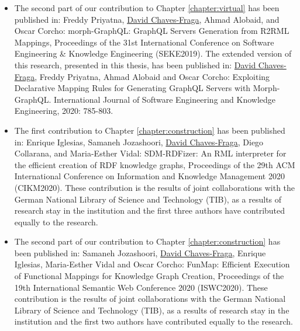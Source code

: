 \begin{itemize}
    \item The second part of our contribution to Chapter \ref{chapter:virtual} has been published in:  Freddy Priyatna, \underline{David Chaves-Fraga}, Ahmad Alobaid, and Oscar Corcho: morph-GraphQL: GraphQL Servers Generation from R2RML Mappings, Proceedings of the 31st International Conference on Software Engineering \& Knowledge Engineering (SEKE2019). The extended version of this research, presented in this thesis, has been published in: \underline{David Chaves-Fraga}, Freddy Priyatna, Ahmad Alobaid and Oscar Corcho: Exploiting Declarative Mapping Rules for Generating GraphQL Servers with Morph-GraphQL. International Journal of Software Engineering and Knowledge Engineering, 2020: 785-803.
    \item The first contribution to Chapter \ref{chapter:construction} has been published in: Enrique Iglesias, Samaneh Jozashoori, \underline{David Chaves-Fraga}, Diego Collarana, and Maria-Esther Vidal: SDM-RDFizer: An RML interpreter for the efficient creation of RDF knowledge graphs, Proceedings of the 29th ACM International Conference on Information and Knowledge Management 2020 (CIKM2020). These contribution is the results of joint collaborations with the German National Library of Science and Technology (TIB), as a results of research stay in the institution and the first three authors have contributed equally to the research.
    \item The second part of our contribution to Chapter \ref{chapter:construction} has been published in: Samaneh Jozashoori, \underline{David Chaves-Fraga}, Enrique Iglesias, Maria-Esther Vidal and Oscar Corcho: FunMap: Efficient Execution of Functional Mappings for Knowledge Graph Creation, Proceedings of the 19th International Semantic Web Conference 2020 (ISWC2020). These contribution is the results of joint collaborations with the German National Library of Science and Technology (TIB), as a results of research stay in the institution and the first two authors have contributed equally to the research.
    
\end{itemize}



